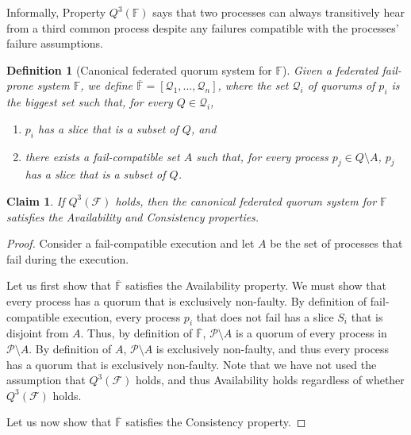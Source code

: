 \documentclass[11pt,letterpaper]{article}
\newtheorem{definition}{Definition}
\newtheorem{claim}{Claim}
\begin{document}
Informally, Property $Q^3(\mathbb{F})$ says that two processes can always transitively hear from a third common process despite any failures compatible with the processes' failure assumptions.

\begin{definition}[Canonical federated quorum system for $\mathbb{F}$]
  \label{def:canonical}
  Given a federated fail-prone system $\mathbb{F}$, we define $\overline{\mathbb{F}}=\left[\mathcal{Q}_1,...,\mathcal{Q}_n\right]$, where the set $\mathcal{Q}_i$ of quorums of $p_i$ is the biggest set such that, for every $Q\in\mathcal{Q}_i$,
  \begin{enumerate}
    \item $p_i$ has a slice that is a subset of $Q$, and
    \item there exists a fail-compatible set $A$ such that, for every process $p_j\in Q\setminus A$, $p_j$ has a slice that is a subset of $Q$.
  \end{enumerate}
\end{definition}



\begin{claim}
  \label{thm:canonical}
  If $Q^3(\mathcal{F})$ holds, then the canonical federated quorum system for $\mathbb{F}$ satisfies the Availability and Consistency properties.
\end{claim}
\begin{proof}
  Consider a fail-compatible execution and let $A$ be the set of processes that fail during the execution.

  Let us first show that $\overline{\mathbb{F}}$ satisfies the Availability property.
  We must show that every process has a quorum that is exclusively non-faulty.
  By definition of fail-compatible execution, every process $p_i$ that does not fail has a slice $S_i$ that is disjoint from $A$.
  Thus, by definition of $\overline{\mathbb{F}}$, $\mathcal{P}\setminus A$ is a quorum of every process in $\mathcal{P}\setminus A$.
  By definition of $A$, $\mathcal{P}\setminus A$ is exclusively non-faulty, and thus every process has a quorum that is exclusively non-faulty.
  Note that we have not used the assumption that $Q^3(\mathcal{F})$ holds, and thus Availability holds regardless of whether $Q^3(\mathcal{F})$ holds.

  Let us now show that $\overline{\mathbb{F}}$ satisfies the Consistency property.
\end{proof}
\end{document}
